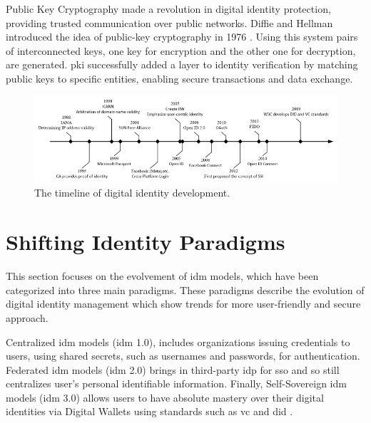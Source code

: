Public Key Cryptography made a revolution in digital identity protection, providing trusted communication over public networks. Diffie and Hellman introduced the idea of 
public-key cryptography in 1976 \cite{businessreporter}. Using this system pairs of interconnected keys, one key for encryption and the other one for decryption, are 
generated. \gls{pki} successfully added a layer to identity verification by matching public keys to specific entities, enabling secure transactions and data exchange.

\begin{figure}[h]  
  \centering
  \includegraphics[width=1\textwidth]{Images/c3_1.png} 
  \caption{The timeline of digital identity development.}
\end{figure}

\section{Shifting Identity Paradigms}

This section focuses on the evolvement of \gls{idm} models, which have been categorized into three main paradigms. These paradigms describe the evolution of digital identity 
management which show trends for more user-friendly and secure approach.

Centralized \gls{idm} models (\gls{idm} 1.0), includes organizations issuing credentials to users, using shared secrets, such as usernames and passwords, for authentication. 
Federated \gls{idm} models (\gls{idm} 2.0) brings in third-party \gls{idp} for \gls{sso} and so still centralizes user's personal identifiable information. Finally, 
Self-Sovereign \gls{idm} models (\gls{idm} 3.0) allows users to have absolute mastery over their digital identities via Digital Wallets using standards such as 
\gls{vc} and \gls{did} \cite{9272212}.

